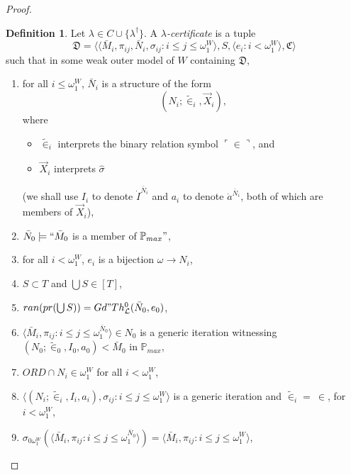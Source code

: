 \documentclass[12pt, twoside]{memoir}
\numberwithin{equation}{section}
\theoremstyle{definition}
\newtheorem{defi}[thm]{Definition}
\theoremstyle{remark}
\theoremstyle{definition}
\theoremstyle{definition}
\theoremstyle{definition}
\theoremstyle{remark}
\begin{document}
\begin{proof}
\begin{defi}\label{def437}
Let $\lambda \in C \cup \{\lambda^{\dagger}\}$. A $\lambda$\emph{-certificate} is a tuple 
\begin{equation*}
    \mathfrak{D} = \langle \langle \bar{M}_i, \pi_{ij},  \bar{N}_i, \sigma_{ij} : i \leq j \leq \omega_1^{W} \rangle, S, \langle e_i : i < \omega_1^W \rangle, \mathfrak{C} \rangle
\end{equation*}
such that in some weak outer model of $W$ containing $\mathfrak{D}$,
\begin{enumerate}[label=(C\arabic*)$_{\lambda}$, leftmargin=40pt]
    \item\label{cd0} for all $i \leq \omega_1^W$, $\bar{N}_i$ is a structure of the form
    \begin{equation*}
        (N_i; \tilde{\in}_i, \Vec{X}_i) \text{,}
    \end{equation*}
    where 
    \begin{itemize}
        \item $\tilde{\in}_i$ interprets the binary relation symbol $\ulcorner \in \urcorner$, and
        \item $\Vec{X}_i$ interprets $\hat{\sigma}$ 
    \end{itemize}
    (we shall use $I_i$ to denote $\dot{I}^{\bar{N}_i}$ and $a_i$ to denote $\dot{a}^{\bar{N}_i}$, both of which are members of $\Vec{X}_i$),
    \item\label{cd1} $\bar{N}_0 \models ``\bar{M}_0$ is a member of $\mathbb{P}_{max}"$,
    \item\label{cd1.5} for all $i < \omega_1^W$, $e_i$ is a bijection $\omega \longrightarrow N_i$,
    \item\label{cd2} $S \subset T$ and $\bigcup S \in [T]$,
    \item\label{cd3} $ran(pr(\bigcup S)) = Gd" Th^0_{\mathcal{L}}(\bar{N}_0, e_0)$,
    \item\label{cd4} $\langle \bar{M}_i, \pi_{ij} : i \leq j \leq \omega_1^{\bar{N}_0} \rangle \in N_0$ is a generic iteration witnessing $(N_0; \tilde{\in}_0, I_0, a_0) < \bar{M}_0$ in $\mathbb{P}_{max}$,
    \item\label{cdnew} $ORD \cap N_i \in \omega_1^W$ for all $i < \omega_1^W$,
    \item\label{cd5} $\langle (N_i; \tilde{\in}_i, I_i, a_i), \sigma_{ij} : i \leq  j \leq \omega_1^{W} \rangle$ is a generic iteration and $\tilde{\in}_i = \ \in$, for $i < \omega_1^W$,
    \item\label{cd6} $\sigma_{0\omega_1^W}(\langle \bar{M}_i, \pi_{ij} : i \leq j \leq \omega_1^{\bar{N}_0} \rangle) = \langle \bar{M}_i, \pi_{ij} : i \leq j \leq \omega_1^W \rangle$, 

\end{enumerate}
\end{defi}
\end{proof}
\end{document}
